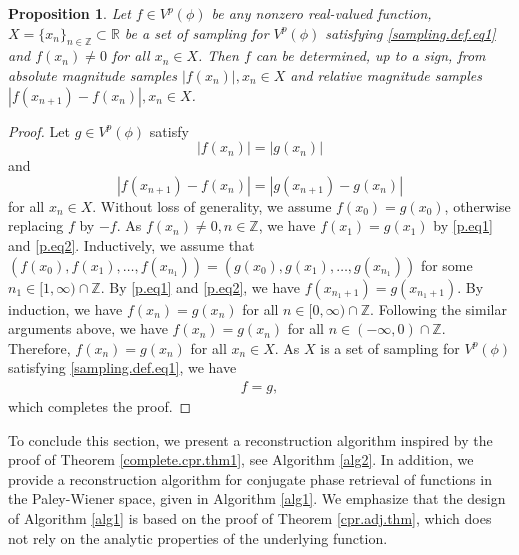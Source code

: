 \documentclass[12pt,oneside,reqno]{amsart}
\newtheorem{proposition}[theorem]{Proposition}%
\newcommand{\Z}{\mathbb{Z}}
\newcommand{\R}{\mathbb{R}}
\numberwithin{equation}{section}
\begin{document}
\begin{proposition}\label{cpr.real.prop}
	Let $f\in V^p(\phi)$ be any nonzero real-valued function, $X=\{x_n\}_{n\in \Z} \subset \R$ be a set of sampling for $V^p(\phi)$ satisfying \eqref{sampling.def.eq1} and   $f(x_n)\ne 0$ for all $x_n\in X$. Then $f$ can be determined, up to a sign, from absolute magnitude samples $ |f(x_n)|, x_n\in X$ and relative magnitude samples $|f(x_{n+1})-f(x_n)|, x_n\in X$. 
\end{proposition}
\begin{proof}
	Let $g\in V^p(\phi)$ satisfy \begin{equation}\label{p.eq1}
		|f(x_n)|=|g(x_n)|
	\end{equation}
	and
	\begin{equation}\label{p.eq2}
		|f(x_{n+1})-f(x_n)|=|g(x_{n+1})-g(x_n)|
	\end{equation}
	for all $x_n\in X$. Without loss of generality, we assume $f(x_0)=g(x_0)$, otherwise replacing $f$ by $-f$. 
	As $f(x_n)\neq 0, n\in \Z$, we have $f(x_{1})=g(x_{1})$ by \eqref{p.eq1} and \eqref{p.eq2}. Inductively, we assume that 
	$(f(x_0), f(x_{1}), \ldots, f(x_{n_1}))=(g(x_0), g(x_{1}), \ldots, g(x_{n_1}))$ for some $n_1\in [1,\infty)\cap \Z$. By \eqref{p.eq1} and \eqref{p.eq2}, we have $f(x_{n_1+1})=g(x_{n_1+1})$. 
	By induction, we have $f(x_n)=g(x_n)$ for all $n\in [0,\infty)\cap \Z$. Following the similar arguments above, we have $f(x_n)=g(x_n)$ for all $n\in (-\infty,0)\cap \Z$. Therefore, $f(x_n)=g(x_n)$ for all $x_n\in X$. As $X$ is a set of sampling for $V^p(\phi)$ satisfying \eqref{sampling.def.eq1}, we have 
	\begin{align*}
		f=g,
	\end{align*}
	which completes the proof.
\end{proof}






To conclude this section, we present a reconstruction algorithm inspired by the proof of Theorem \ref{complete.cpr.thm1}, see Algorithm \ref{alg2}. In addition, we provide a reconstruction algorithm for conjugate phase retrieval of functions in the Paley-Wiener space, given in Algorithm \ref{alg1}. We emphasize that the design of Algorithm \ref{alg1} is based on the proof of Theorem \ref{cpr.adj.thm}, which does not rely on the analytic properties of the underlying function.
\end{document}
